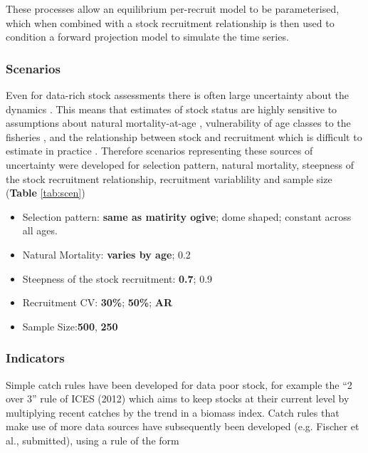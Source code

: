 \documentclass[12pt,doublespacing,a4paper]{ouparticle}
\begin{document}
These processes allow an equilibrium per-recruit model to be parameterised, which when combined with a stock recruitment relationship \cite{sissenwine1987alternative} is then used to condition a forward projection model to simulate the time series.

\subsubsection{Scenarios}

Even for data-rich stock assessments there is often large uncertainty about the dynamics \citep[i.e. model uncertainty;][]{punt2008refocusing}. This means that estimates of stock status are highly sensitive to assumptions about natural mortality-at-age \citep{jiao2012modelling}, vulnerability of age classes to the fisheries \citep{brooks2009analytical}, and the relationship between stock and recruitment which is difficult to estimate in practice \citep[e.g.][]{vert2013frequency,szuwalski2014examining,cury2014resolving,kell2015spawning,pepin2015reconsidering}. Therefore scenarios \citep[][]{ono2015importance,kell2015spawning,boorman1997recognising} representing these sources of uncertainty were developed for selection pattern, natural mortality, steepness of the stock recruitment relationship, recruitment variablility and sample size (\textbf{Table} \ref{tab:scen})

\begin{itemize}
 \item Selection pattern: \textbf{same as matirity ogive}; dome shaped; constant across all ages.
 \item Natural Mortality: \textbf{varies by age}; 0.2 
 \item Steepness of the stock recruitment: \textbf{0.7}; 0.9 
 \item Recruitment CV: \textbf{30\%}; \textbf{50\%}; \textbf{AR}
 \item Sample Size:\textbf{500}, \textbf{250}
\end{itemize}


\subsubsection{Indicators}




Simple catch rules have been developed for data poor stock, for example the “2 over 3” rule  of ICES (2012) which aims to keep stocks at their current level by multiplying recent catches by the trend in a biomass index. Catch rules that make use of more data sources have subsequently been developed (e.g. Fischer et al., submitted), using a rule of the form
\end{document}

